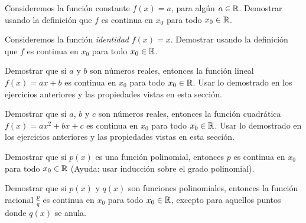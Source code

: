 \item Consideremos la función constante $f(x)=a$, para algún $a\in\mathbb{R}$. Demostrar usando la definición que $f$ es continua en $x_0$ para todo $x_0\in\mathbb{R}$.
\item Consideremos la función \emph{identidad} $f(x)=x$. Demostrar usando la definición que $f$ es continua en $x_0$ para todo $x_0\in\mathbb{R}$.
\item Demostrar que si $a$ y $b$ son números reales, entonces la función lineal $f(x)=ax+b$ es continua en $x_0$ para todo $x_0\in\mathbb{R}$.
Usar lo demostrado en los ejercicios anteriores y las propiedades vistas en esta sección.
\item Demostrar que si $a$, $b$ y $c$ son números reales, entonces la función cuadrática $f(x)=ax^2+bx+c$ es continua en $x_0$ para todo $x_0\in\mathbb{R}$.
Usar lo demostrado en los ejercicios anteriores y las propiedades vistas en esta sección.
\item\label{ej:polinomios-continuos} Demostrar que si $p(x)$ es una función polinomial, entonces $p$ es continua en $x_0$ para todo $x_0\in\mathbb{R}$ (Ayuda: usar inducción sobre el grado polinomial).
\item Demostrar que si $p(x)$ y $q(x)$ son funciones polinomiales, entonces la función racional $\frac pq$ es continua en $x_0$ para todo $x_0\in\mathbb{R}$, excepto para aquellos puntos donde $q(x)$ se anula. 

